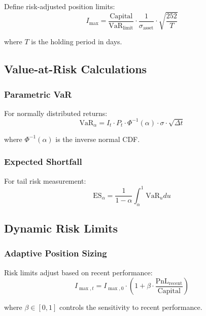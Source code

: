 \documentclass[11pt,a4paper]{article}
\theoremstyle{definition}
\begin{document}
Define risk-adjusted position limits:
\begin{equation}
I_{\max} = \frac{\text{Capital}}{\text{VaR}_{\text{limit}}} \cdot \frac{1}{\sigma_{\text{asset}}} \cdot \sqrt{\frac{252}{T}}
\end{equation}

where $T$ is the holding period in days.

\subsection{Value-at-Risk Calculations}

\subsubsection{Parametric VaR}

For normally distributed returns:
\begin{equation}
\text{VaR}_{\alpha} = I_t \cdot P_t \cdot \Phi^{-1}(\alpha) \cdot \sigma \cdot \sqrt{\Delta t}
\end{equation}

where $\Phi^{-1}(\alpha)$ is the inverse normal CDF.

\subsubsection{Expected Shortfall}

For tail risk measurement:
\begin{equation}
\text{ES}_{\alpha} = \frac{1}{1-\alpha} \int_{\alpha}^1 \text{VaR}_u du
\end{equation}

\subsection{Dynamic Risk Limits}

\subsubsection{Adaptive Position Sizing}

Risk limits adjust based on recent performance:
\begin{equation}
I_{\max, t} = I_{\max, 0} \cdot \left(1 + \beta \cdot \frac{\text{PnL}_{\text{recent}}}{\text{Capital}}\right)
\end{equation}

where $\beta \in [0,1]$ controls the sensitivity to recent performance.
\end{document}
